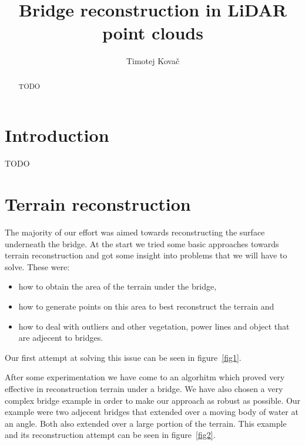 \documentclass{egpubl-eurovis-star}
\title[EG \LaTeX\ Author Guidelines]%
      {Bridge reconstruction in LiDAR point clouds}
\author[submission ID]{Timotej Kovač}
\begin{document}

\maketitle

\begin{abstract}
TODO
\end{abstract}



\section{Introduction}

TODO



\section{Terrain reconstruction}

The majority of our effort was aimed towards reconstructing the surface underneath the bridge.
At the start we tried some basic approaches towards terrain reconstruction and got some insight into problems that we will have to solve.
These were:
\begin{itemize}
\item{how to obtain the area of the terrain under the bridge,}
\item{how to generate points on this area to best reconstruct the terrain and}
\item{how to deal with outliers and other vegetation, power lines and object that are adjecent to bridges.}
\end{itemize}

Our first attempt at solving this issue can be seen in figure~\ref{fig1}.


After some experimentation we have come to an algorhitm which proved very effective in reconstruction terrain under a bridge.
We have also chosen a very complex bridge example in order to make our approach as robust as possible.
Our example were two adjecent bridges that extended over a moving body of water at an angle.
Both also extended over a large portion of the terrain.
This example and its reconstruction attempt can be seen in figure~\ref{fig2}.

\end{document}

